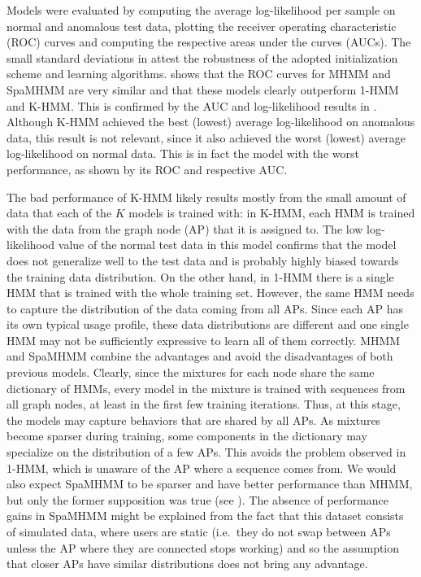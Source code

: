 Models were evaluated by computing the average log-likelihood per sample on normal and anomalous test data, plotting the receiver operating characteristic (ROC) curves and computing the respective areas under the curves (AUCs). The small standard deviations in  attest the robustness of the adopted initialization scheme and learning algorithms.  shows that the ROC curves for MHMM and SpaMHMM are very similar and that these models clearly outperform 1-HMM and K-HMM. This is confirmed by the AUC and log-likelihood results in . Although K-HMM achieved the best (lowest) average log-likelihood on anomalous data, this result is not relevant, since it also achieved the worst (lowest) average log-likelihood on normal data. This is in fact the model with the worst performance, as shown by its ROC and respective AUC.

The bad performance of K-HMM likely results mostly from the small amount of data that each of the $K$ models is trained with: in K-HMM, each HMM is trained with the data from the graph node (AP) that it is assigned to. The low log-likelihood value of the normal test data in this model confirms that the model does not generalize well to the test data and is probably highly biased towards the training data distribution. On the other hand, in 1-HMM there is a single HMM that is trained with the whole training set. However, the same HMM needs to capture the distribution of the data coming from all APs. Since each AP has its own typical usage profile, these data distributions are different and one single HMM may not be sufficiently expressive to learn all of them correctly. MHMM and SpaMHMM combine the advantages and avoid the disadvantages of both previous models. Clearly, since the mixtures for each node share the same dictionary of HMMs, every model in the mixture is trained with sequences from all graph nodes, at least in the first few training iterations. Thus, at this stage, the models may capture behaviors that are shared by all APs. As mixtures become sparser during training, some components in the dictionary may specialize on the distribution of a few APs. This avoids the problem observed in 1-HMM, which is unaware of the AP where a sequence comes from. We would also expect SpaMHMM to be sparser and have better performance than MHMM, but only the former supposition was true (see ). The absence of performance gains in SpaMHMM might be explained from the fact that this dataset consists of simulated data, where users are static (i.e.\ they do not swap between APs unless the AP where they are connected stops working) and so the assumption that closer APs have similar distributions does not bring any advantage.

